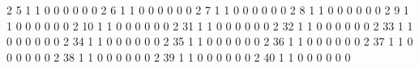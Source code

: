   {\VBAR}  2    5   1        1        0        0        0        0        0        0 {\VBAR}
  {\VBAR}  2    6   1        1        0        0        0        0        0        0 {\VBAR}
  {\VBAR}  2    7   1        1        0        0        0        0        0        0 {\VBAR}
  {\VBAR}  2    8   1        1        0        0        0        0        0        0 {\VBAR}
  {\VBAR}  2    9   1        1        0        0        0        0        0        0 {\VBAR}
  {\VBAR}  2   10   1        1        0        0        0        0        0        0 {\VBAR}
  {\LFTT}
  {\VBAR}  2   31   1        1        0        0        0        0        0        0 {\VBAR}
  {\VBAR}  2   32   1        1        0        0        0        0        0        0 {\VBAR}
  {\VBAR}  2   33   1        1        0        0        0        0        0        0 {\VBAR}
  {\VBAR}  2   34   1        1        0        0        0        0        0        0 {\VBAR}
  {\VBAR}  2   35   1        1        0        0        0        0        0        0 {\VBAR}
  {\VBAR}  2   36   1        1        0        0        0        0        0        0 {\VBAR}
  {\VBAR}  2   37   1        1        0        0        0        0        0        0 {\VBAR}
  {\VBAR}  2   38   1        1        0        0        0        0        0        0 {\VBAR}
  {\VBAR}  2   39   1        1        0        0        0        0        0        0 {\VBAR}
  {\VBAR}  2   40   1        1        0        0        0        0        0        0 {\VBAR}
  {\BLC}
